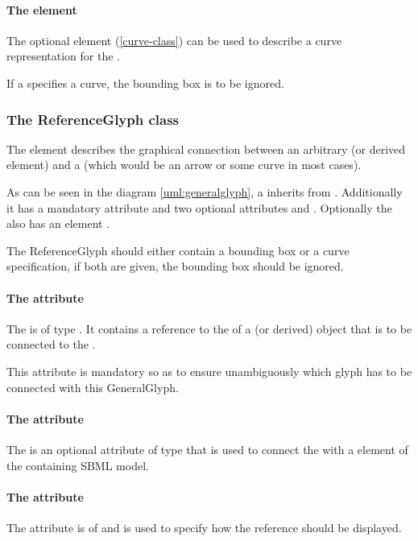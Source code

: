 \paragraph {The  element}
The optional \Curve element (\ref{curve-class}) can be used to describe 
a curve representation for the \GeneralGlyph. 

If a \GeneralGlyph specifies a curve, the bounding box is to be ignored. 

\subsubsection{The ReferenceGlyph class}
\label{referenceglyph-class}
The  element describes the graphical connection 
between an arbitrary \GraphicalObject (or derived element) and a 
\GeneralGlyph (which would be an arrow or some curve in most cases). 

As can be seen in the diagram \ref{uml:generalglyph}, a \ReferenceGlyph 
inherits from \GraphicalObject. Additionally it has a mandatory 
attribute  and two optional attributes  
and . Optionally the \ReferenceGlyph also has an element 
. 

The ReferenceGlyph should either contain a bounding box or a curve 
specification, if both are given, the bounding box should be ignored. 

\paragraph{The  attribute}
The  is of type . It contains a reference 
to the  of a \GraphicalObject (or derived) object that is to 
be connected to the \GeneralGlyph. 

This attribute is mandatory so as to ensure unambiguously which glyph has to be 
connected with this GeneralGlyph. 


\paragraph{The  attribute}
The  is an optional attribute of type  
that is used to connect the \ReferenceGlyph with a element of the 
containing SBML model. 

\paragraph{The  attribute}
The  attribute is of  and is used to 
specify how the reference should be displayed. 

